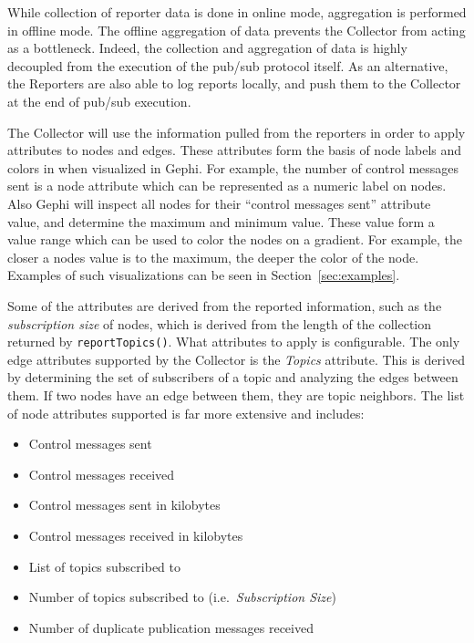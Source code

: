 While collection of reporter data is done in online mode, aggregation is performed in
offline mode. The offline aggregation of data prevents the Collector
from acting as a bottleneck. Indeed, the collection and aggregation of
data is highly decoupled from the execution of the pub/sub protocol
itself. As an alternative, the Reporters are also able to log reports
locally, and push them to the Collector at the end of pub/sub execution.

The Collector will use the information pulled from the reporters in
order to apply attributes to nodes and edges. These attributes form the
basis of node labels and colors in when visualized in Gephi. For
example, the number of control messages sent is a node attribute which
can be represented as a numeric label on nodes. Also Gephi will inspect
all nodes for their ``control messages sent'' attribute value, and
determine the maximum and minimum value. These value form a value range
which can be used to color the nodes on a gradient. For example, the
closer a nodes value is to the maximum, the deeper the color of the
node. Examples of such visualizations can be seen in
Section~\ref{sec:examples}.

Some of the attributes are derived from the reported information, such
as the \emph{subscription size} of nodes, which is derived from the length of the
collection returned by \texttt{reportTopics()}. What attributes to apply
is configurable. The only edge attributes supported by the Collector is
the \emph{Topics} attribute. This is derived by determining the set of
subscribers of a topic and analyzing the edges between them. If two
nodes have an edge between them, they are topic neighbors. The list of
node attributes supported is far more extensive and includes:

\begin{itemize}
    \item Control messages sent
    \item Control messages received
    \item Control messages sent in kilobytes
    \item Control messages received in kilobytes
    \item List of topics subscribed to
    \item Number of topics subscribed to (i.e.\ \emph{Subscription Size})
    \item Number of duplicate publication messages received
\end{itemize}

